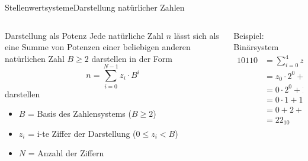\documentclass[xelatex,aspectratio=169]{beamer}
\begin{document}
\begin{frame}{Stellenwertsysteme}{Darstellung natürlicher Zahlen}
  \begin{columns}
    \begin{column}{0.5\textwidth}
      \begin{block}{Darstellung als Potenz}
        Jede natürliche Zahl \(n\) lässt sich als eine Summe von Potenzen einer beliebigen anderen natürlichen Zahl \(B \geq 2 \) darstellen in der Form
        \[
          n = \sum_{i=0}^{N-1} z_i \cdot B^i
        \]
        darstellen
        \begin{itemize}
          \item \(B\) = Basis des Zahlensystems (\(B \geq 2\))
          \item \(z_i\) = i-te Ziffer der Darstellung (\(0 \leq z_i < B\))
          \item \(N\) = Anzahl der Ziffern
        \end{itemize}
      \end{block}
    \end{column}
    \begin{column}{0.5\textwidth}
      \begin{exampleblock}{Beispiel: Binärsystem}
        \smaller
        \begin{align*}
          10110 & = \sum_{i=0}^{4} z_i \cdot 2^i                                                  \\
                & = z_0 \cdot 2^0 + z_1 \cdot 2^1 + z_2 \cdot 2^2 + z_3 \cdot 2^3 + z_4 \cdot 2^4 \\
                & = 0 \cdot 2^0 + 1 \cdot 2^1 + 1 \cdot 2^2 + 0 \cdot 2^3 + 1 \cdot 2^4           \\
                & = 0 \cdot 1 + 1 \cdot 2 + 1 \cdot 4 + 0 \cdot 8 + 1 \cdot 16                    \\
                & = 0 + 2 + 4 + 0 + 16                                                            \\
                & = 22_{10}
        \end{align*}
      \end{exampleblock}
    \end{column}
  \end{columns}
\end{frame}
\end{document}
